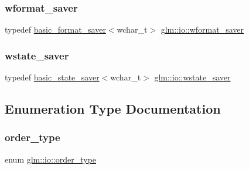 \mbox{\label{namespaceglm_1_1io_a6229ca888648a0ff823eb120f61de481}} 
\subsubsection{\texorpdfstring{wformat\+\_\+saver}{wformat\_saver}}
{\footnotesize\ttfamily typedef \mbox{\hyperlink{classglm_1_1io_1_1basic__format__saver}{basic\+\_\+format\+\_\+saver}}$<$wchar\+\_\+t$>$ \mbox{\hyperlink{namespaceglm_1_1io_a6229ca888648a0ff823eb120f61de481}{glm\+::io\+::wformat\+\_\+saver}}}

\mbox{\label{namespaceglm_1_1io_a7a46501fc459c05fa3dc0f2bcbf3e92f}} 
\subsubsection{\texorpdfstring{wstate\+\_\+saver}{wstate\_saver}}
{\footnotesize\ttfamily typedef \mbox{\hyperlink{classglm_1_1io_1_1basic__state__saver}{basic\+\_\+state\+\_\+saver}}$<$wchar\+\_\+t$>$ \mbox{\hyperlink{namespaceglm_1_1io_a7a46501fc459c05fa3dc0f2bcbf3e92f}{glm\+::io\+::wstate\+\_\+saver}}}



\subsection{Enumeration Type Documentation}
\mbox{\label{namespaceglm_1_1io_a3497781803fe594a37177e05ab2a795f}} 
\subsubsection{\texorpdfstring{order\+\_\+type}{order\_type}}
{\footnotesize\ttfamily enum \mbox{\hyperlink{namespaceglm_1_1io_a3497781803fe594a37177e05ab2a795f}{glm\+::io\+::order\+\_\+type}}}

